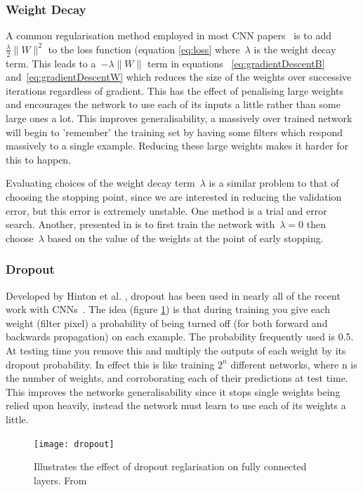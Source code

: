 \documentclass[11pt]{article} %
\begin{document}
\subsubsection{Weight Decay}
A common regularisation method employed in most CNN papers~\cite{Simonyan2015,Krizhevsky2012,Sermanet2013b} is to add~$ \frac{\lambda}{2} \|W\|^2$ to the loss function (equation \ref{eq:loss} where~$\lambda$ is the weight decay term. This leads to a~$-\lambda \|W\|$ term in equations ~\ref{eq:gradientDescentB} and~\ref{eq:gradientDescentW} which reduces the size of the weights over successive iterations regardless of gradient. This has the effect of penalising large weights and encourages the network to use each of its inputs a little rather than some large ones a lot. This improves generalisability, a massively over trained network will begin to 'remember' the training set by having some filters which respond massively to a single example. Reducing these large weights makes it harder for this to happen.

Evaluating choices of the weight decay term~$\lambda$ is a similar problem to that of choosing the stopping point, since we are interested in reducing the validation error, but this error is extremely unstable. One method is a trial and error search. Another, presented in \cite{Rognvaldsson2012} is to first train the network with~$\lambda = 0$ then choose~$\lambda$ based on the value of the weights at the point of early stopping. 

\subsubsection{Dropout}

Developed by Hinton et al. \cite{Hinton2014}, dropout has been used in nearly all of the recent  work with CNNs~\cite{Toshev,Pfister,Krizhevsky2012,Tompson,Li2014,Szegedy2014,Sermanet2013b,Simonyan2015,Zeiler2014}. The idea (figure \ref{fig:dropout}) is that during training you give each weight (filter pixel) a probability of being turned off (for both forward and backwards propagation) on each example. The probability frequently used is 0.5. At testing time you remove this and multiply the outputs of each weight by its dropout probability. In effect this is like training $2^n$ different networks, where n is the number of weights, and corroborating each of their predictions at test time. This improves the networks generalisability since it stops single weights being relied upon heavily, instead the network must learn to use each of its weights a little.
\begin{figure}
\centering
\texttt{[image: dropout]}
\caption{Illustrates the effect of dropout reglarisation on fully connected layers.\label{fig:dropout} From \cite{Hinton2014} } 
\end{figure}
\end{document}
